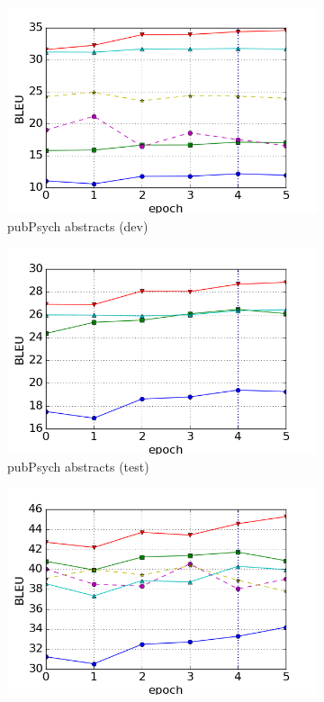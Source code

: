 \documentclass[a4paper,11pt]{article}
\begin{document}
\begin{figure}
    \centering
    \begin{subfigure}[b]{0.45\textwidth}{
        \includegraphics[width=\textwidth]{./img/adam/pp_abs_dev}
        \caption{pubPsych abstracts (dev)}
        \label{fig:pp_abs_dev}}
    \end{subfigure}
    \begin{subfigure}[b]{0.45\textwidth}
        \includegraphics[width=\textwidth]{./img/adam/pp_abs_test}
        \caption{pubPsych abstracts (test)}
        \label{fig:pp_abs_set}
    \end{subfigure}
    \begin{subfigure}[b]{0.45\textwidth}
        \includegraphics[width=\textwidth]{./img/adam/pp_title_test}

\end{subfigure}
\end{figure}
\end{document}
